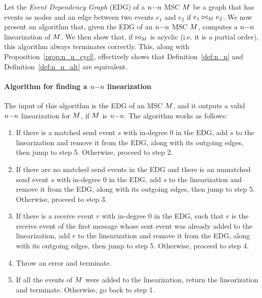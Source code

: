Let the \emph{Event Dependency Graph} (EDG) of a $n\mathsf{-}n$ MSC $M$ be a graph that has events as nodes and an edge between two events $e_1$ and $e_2$ if $e_1 \bowtie_M e_2$. We now present an algorithm that, given the EDG of an $n\mathsf{-}n$ MSC $M$, computes a $n\mathsf{-}n$ linearization of $M$. We then show that, if $\bowtie_M$ is acyclic (i.e. it is a partial order), this algorithm always terminates correctly. This, along with Proposition~\ref{prop:n_n_cycl}, effectively shows that Definition~\ref{def:n_n} and Definition~\ref{def:n_n_alt} are equivalent.

\paragraph*{Algorithm for finding a $n\mathsf{-}n$ linearization}
The input of this algorithm is the EDG of an MSC $M$, and it outputs a valid $n\mathsf{-}n$ linearization for $M$, if $M$ is $n\mathsf{-}n$. The algorithm works as follows:
\begin{enumerate}
	\item If there is a matched send event $s$ with in-degree 0 in the EDG, add $s$ to the linearization and remove it from the EDG, along with its outgoing edges, then jump to step 5. Otherwise, proceed to step 2.
	\item If there are no matched send events in the EDG and there is an unmatched send event $s$ with in-degree 0 in the EDG, add $s$ to the linearization and remove it from the EDG, along with its outgoing edges, then jump to step 5. Otherwise, proceed to step 3.
 	\item If there is a receive event $r$ with in-degree 0 in the EDG, such that $r$ is the receive event of the first message whose sent event was already added to the linearization, add $r$ to the linearization and remove it from the EDG, along with its outgoing edges, then jump to step 5. Otherwise, proceed to step 4.
   	\item Throw an error and terminate.
   	\item If all the events of $M$ were added to the linearization, return the linearization and terminate. Otherwise, go back to step 1.
\end{enumerate} 

